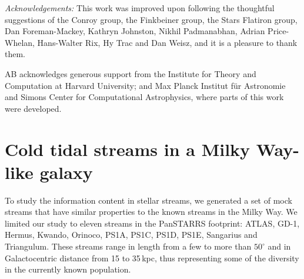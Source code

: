 \documentclass[modern]{aastex61}
\begin{document}

\emph{Acknowledgements:} This work was improved upon following the thoughtful suggestions of the Conroy group, the Finkbeiner group, the Stars Flatiron group, Dan Foreman-Mackey, Kathryn Johnston, Nikhil Padmanabhan, Adrian Price-Whelan, Hans-Walter Rix, Hy Trac and Dan Weisz, and it is a pleasure to thank them.

AB acknowledges generous support from the Institute for Theory and Computation at Harvard University; and Max Planck Institut f\"ur Astronomie and Simons Center for Computational Astrophysics, where parts of this work were developed.




\appendix
\section{Cold tidal streams in a Milky Way-like galaxy}
\label{sec:streams}
To study the information content in stellar streams, we generated a set of mock streams that have similar properties to the known streams in the Milky Way.
We limited our study to eleven streams in the PanSTARRS footprint: ATLAS, GD-1, Hermus, Kwando, Orinoco, PS1A, PS1C, PS1D, PS1E, Sangarius and Triangulum.
These streams range in length from a few to more than $50^\circ$ and in Galactocentric distance from 15 to 35\,kpc, thus representing some of the diversity in the currently known population.
\end{document}
